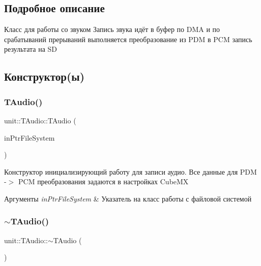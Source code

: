 \subsection{Подробное описание}


 Класс для работы со звуком Запись звука идёт в буфер по D\+MA и по срабатываний прерываний выполняется преобразование из P\+DM в P\+CM запись результата на SD 

\subsection{Конструктор(ы)}
\mbox{\label{classunit_1_1_t_audio_a326d9d807df56ef1a264564c69c350b5}} 
\subsubsection{\texorpdfstring{T\+Audio()}{TAudio()}}
{\footnotesize\ttfamily unit\+::\+T\+Audio\+::\+T\+Audio (\begin{DoxyParamCaption}\item[{std\+::shared\+\_\+ptr$<$ \hyperlink{classunit_1_1_t_file_system}{T\+File\+System} $>$}]{in\+Ptr\+File\+System }\end{DoxyParamCaption})}

Конструктор инициализирующий работу для записи аудио. Все данные для P\+DM -\/$>$ P\+CM преобразования задаются в настройках Cube\+MX 
\begin{DoxyParams}{Аргументы}
{\em in\+Ptr\+File\+System} & Указатель на класс работы с файловой системой \\
\hline
\end{DoxyParams}
\mbox{\label{classunit_1_1_t_audio_ab62b7453a3128fd1ab9d2473237ba331}} 
\subsubsection{\texorpdfstring{$\sim$\+T\+Audio()}{~TAudio()}}
{\footnotesize\ttfamily unit\+::\+T\+Audio\+::$\sim$\+T\+Audio (\begin{DoxyParamCaption}{ }\end{DoxyParamCaption})\hspace{0.3cm}{\ttfamily [virtual]}}

